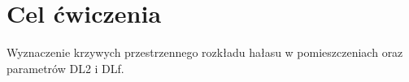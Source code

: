 \section{Cel ćwiczenia}
Wyznaczenie krzywych przestrzennego rozkładu hałasu w pomieszczeniach oraz parametrów DL2 i DLf.
